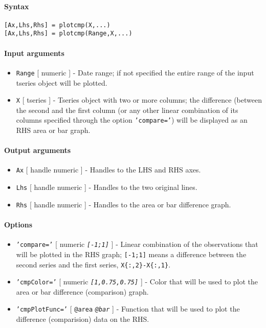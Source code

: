 


	\paragraph{Syntax}

\begin{verbatim}
[Ax,Lhs,Rhs] = plotcmp(X,...)
[Ax,Lhs,Rhs] = plotcmp(Range,X,...)
\end{verbatim}

\paragraph{Input arguments}

\begin{itemize}
\item
  \texttt{Range} {[} numeric {]} - Date range; if not specified the
  entire range of the input tseries object will be plotted.
\item
  \texttt{X} {[} tseries {]} - Tseries object with two or more columns;
  the difference (between the second and the first column (or any other
  linear combination of its columns specified through the option
  \texttt{'compare='}) will be displayed as an RHS area or bar graph.
\end{itemize}

\paragraph{Output arguments}

\begin{itemize}
\item
  \texttt{Ax} {[} handle \textbar{} numeric {]} - Handles to the LHS and
  RHS axes.
\item
  \texttt{Lhs} {[} handle \textbar{} numeric {]} - Handles to the two
  original lines.
\item
  \texttt{Rhs} {[} handle \textbar{} numeric {]} - Handles to the area
  or bar difference graph.
\end{itemize}

\paragraph{Options}

\begin{itemize}
\item
  \texttt{'compare='} {[} numeric \textbar{} \emph{\texttt{{[}-1;1{]}}}
  {]} - Linear combination of the observations that will be plotted in
  the RHS graph; \texttt{{[}-1;1{]}} means a difference between the
  second series and the first series, \texttt{X\{:,2\}-X\{:,1\}}.
\item
  \texttt{'cmpColor='} {[} numeric \textbar{}
  \emph{\texttt{{[}1,0.75,0.75{]}}} {]} - Color that will be used to
  plot the area or bar difference (comparison) graph.
\item
  \texttt{'cmpPlotFunc='} {[} \texttt{@area} \textbar{}
  \emph{\texttt{@bar}} {]} - Function that will be used to plot the
  difference (comparision) data on the RHS.
\end{itemize}

